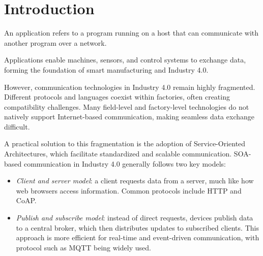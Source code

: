 \section{Introduction}

\begin{definition}
    An application refers to a program running on a host that can communicate with another program over a network.
\end{definition}
\noindent Applications enable machines, sensors, and control systems to exchange data, forming the foundation of smart manufacturing and Industry 4.0.

However, communication technologies in Industry 4.0 remain highly fragmented. 
Different protocols and languages coexist within factories, often creating compatibility challenges. 
Many field-level and factory-level technologies do not natively support Internet-based communication, making seamless data exchange difficult.

A practical solution to this fragmentation is the adoption of Service-Oriented Architectures, which facilitate standardized and scalable communication. 
SOA-based communication in Industry 4.0 generally follows two key models:
\begin{itemize}
    \item \textit{Client and server model}: a client requests data from a server, much like how web browsers access information. 
        Common protocols include HTTP and CoAP.
    \item \textit{Publish and subscribe model}: instead of direct requests, devices publish data to a central broker, which then distributes updates to subscribed clients. 
        This approach is more efficient for real-time and event-driven communication, with protocol such as MQTT being widely used.
\end{itemize}
